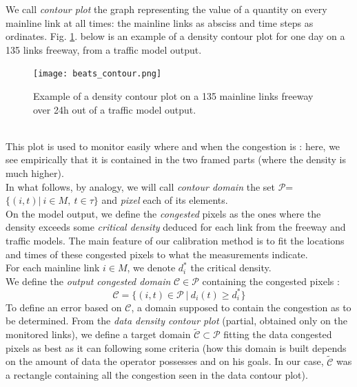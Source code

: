We call \emph{contour plot} the graph representing the value of a quantity on every mainline link at all times: the mainline links as absciss and time steps as ordinates.
Fig. \ref{fig:beats_contour}. below is an example of a density contour plot for one day on a 135 links freeway, from a traffic model output.\\
\begin{figure}[h!]
	\caption{Example of a density contour plot on a 135 mainline links freeway over 24h out of a traffic model output.}
	\centering
	\label{fig:beats_contour}
	\texttt{[image: beats\_contour.png]}
\end{figure}\\
This plot is used to monitor easily where and when the congestion is : here, we see empirically that it is contained in the two framed parts (where the density is much higher).\\
In what follows, by analogy, we will call \emph{contour domain} the set $\mathscr{P}$=$\big\{(i,t)|\ i\in M,\ t\in\tau\big\}$ and \emph{pixel} each of its elements.\\
On the model output, we define the \emph{congested} pixels as the ones where the density exceeds some \emph{critical density} deduced for each link from the freeway and traffic models. The main feature of our calibration method is to fit the locations and times of these congested pixels to what the measurements indicate.\\
For each mainline link $i\in{M}$, we denote $d_{i}^{*}$ the critical density.
\\
We define the \emph{output congested domain} $\mathscr{C}\in\mathscr{P}$ containing the congested pixels :
\begin{equation*}
	\mathscr{C}=\big\{ (i,t)\in{\mathscr{P}}\ |\ {d_{i}(t) \geq d_{i}^{*}}\big\}
\end{equation*}
To define an error based on $\mathscr{C}$, a domain supposed to contain the congestion as to be determined.
From the  \emph{data density contour plot} (partial, obtained only on the monitored links), we define a target domain $\widetilde{\mathscr{C}}\subset\mathscr{P}$ fitting the data congested pixels as best as it can following some criteria (how this domain is built depends on the amount of data the operator possesses and on his goals. In our case, $\widetilde{\mathscr{C}}$ was a rectangle containing all the congestion seen in the data contour plot).\\
